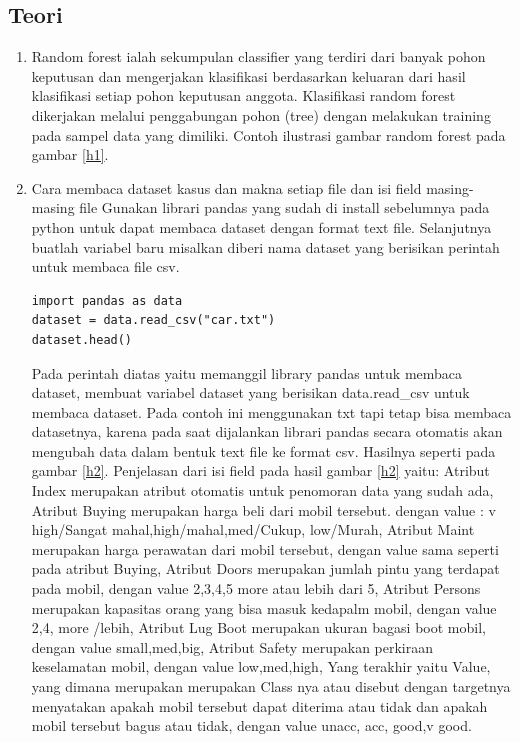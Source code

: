 \subsection{Teori}
\begin{enumerate}
\item Random forest ialah sekumpulan classifier yang terdiri dari banyak pohon keputusan dan mengerjakan klasifikasi berdasarkan keluaran dari hasil klasifikasi setiap pohon keputusan anggota. Klasifikasi random forest dikerjakan melalui penggabungan pohon (tree) dengan melakukan training pada sampel data yang dimiliki. Contoh ilustrasi gambar random forest pada gambar \ref{h1}.
\item Cara membaca dataset kasus dan makna setiap file dan isi field masing-masing file
\subitem Gunakan librari pandas yang sudah di install sebelumnya pada python untuk dapat membaca dataset dengan format text file.
\subitem  Selanjutnya buatlah variabel baru misalkan diberi nama dataset yang berisikan perintah untuk membaca file csv.
\begin{verbatim}
import pandas as data
dataset = data.read_csv("car.txt")
dataset.head()
\end{verbatim}
\subitem Pada perintah diatas yaitu memanggil library pandas untuk membaca dataset, membuat variabel dataset yang berisikan data.read\_csv untuk membaca dataset. Pada contoh ini menggunakan txt tapi tetap bisa membaca datasetnya, karena pada saat dijalankan librari pandas secara otomatis akan mengubah data dalam bentuk text file ke format csv. Hasilnya seperti pada gambar \ref{h2}.
\subitem Penjelasan dari isi field pada hasil gambar \ref{h2} yaitu: Atribut Index merupakan atribut otomatis untuk penomoran data yang sudah ada, Atribut Buying merupakan harga beli dari mobil tersebut. dengan value : v high/Sangat mahal,high/mahal,med/Cukup, low/Murah, Atribut Maint merupakan harga perawatan dari mobil tersebut, dengan value sama seperti pada atribut Buying, Atribut Doors merupakan jumlah pintu yang terdapat pada mobil, dengan value 2,3,4,5 more atau lebih dari 5, Atribut Persons merupakan kapasitas orang yang bisa masuk kedapalm mobil, dengan value 2,4, more /lebih, Atribut Lug Boot merupakan ukuran bagasi boot mobil, dengan value small,med,big, Atribut Safety merupakan perkiraan keselamatan mobil, dengan value low,med,high, Yang terakhir yaitu Value, yang dimana merupakan merupakan Class nya atau disebut dengan targetnya menyatakan apakah mobil tersebut dapat diterima atau tidak dan apakah mobil tersebut bagus atau tidak, dengan value unacc, acc, good,v good.

\end{enumerate}
